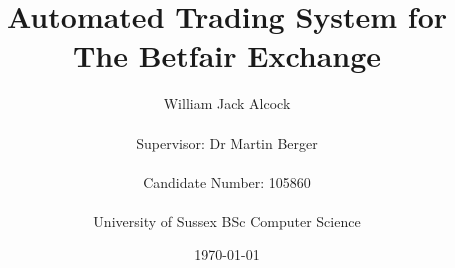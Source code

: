 \documentclass[11pt]{report}
\begin{document}
\title{Automated Trading System for The Betfair Exchange}
\author{William Jack Alcock\\\\Supervisor: Dr Martin Berger\\\\Candidate Number: 105860\\\\University of Sussex BSc Computer Science}
\date{\today}

\maketitle







\tableofcontents
\listoffigures
\listoftables












\printbibliography[heading=bibintoc]
\end{document}
